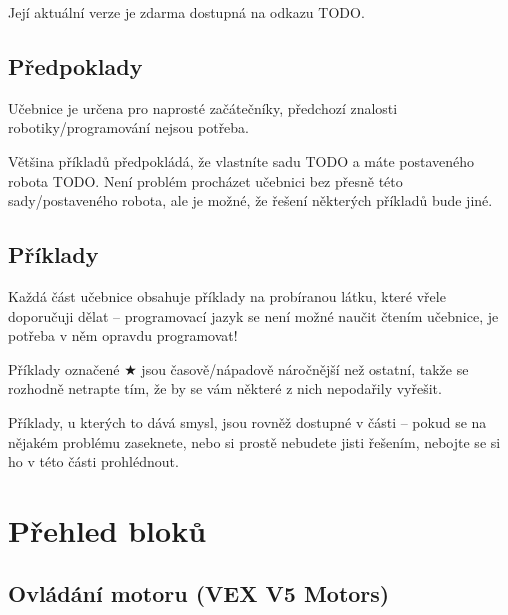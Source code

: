 Její aktuální verze je zdarma dostupná na odkazu TODO.

\subsection{Předpoklady}
Učebnice je určena pro naprosté začátečníky, předchozí znalosti robotiky/programování nejsou potřeba.

Většina příkladů předpokládá, že vlastníte sadu TODO a máte postaveného robota TODO. Není problém procházet učebnici bez přesně této sady/postaveného robota, ale je možné, že řešení některých příkladů bude jiné.

\subsection{Příklady}
Každá část učebnice obsahuje příklady na probíranou látku, které vřele doporučuji dělat -- programovací jazyk se není možné naučit čtením učebnice, je potřeba v něm opravdu programovat!

Příklady označené $\bigstar$ jsou časově/nápadově náročnější než ostatní, takže se rozhodně netrapte tím, že by se vám některé z nich nepodařily vyřešit.

Příklady, u kterých to dává smysl, jsou rovněž dostupné v části  -- pokud se na nějakém problému zaseknete, nebo si prostě nebudete jisti řešením, nebojte se si ho v této části prohlédnout.

\errata

\newpage

\setcounter{secnumdepth}{3}

\newpage

\newpage

\newpage

\newpage

\newpage

\newpage
\setcounter{secnumdepth}{0}

\newcommand{\where}[1]{{\normalfont (#1)}}

\section{Přehled bloků}

\subsection{Ovládání motoru \where{VEX V5 Motors}}
\begin{itemize}
	\blockMotorStart
	\blockMotorStop
	\blockMotorDistance
	\blockMotorVelocity
\end{itemize}

